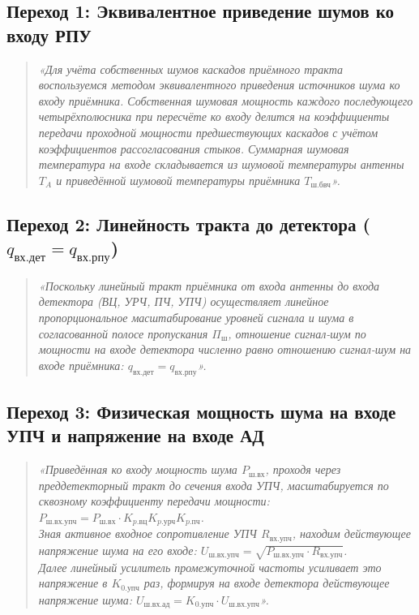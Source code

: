 \documentclass[12pt,a4paper]{article}
\begin{document}
\subsection{Переход 1: Эквивалентное приведение шумов ко входу РПУ}
\begin{quote}
\textit{«Для учёта собственных шумов каскадов приёмного тракта воспользуемся методом эквивалентного приведения источников шума ко входу приёмника. Собственная шумовая мощность каждого последующего четырёхполюсника при пересчёте ко входу делится на коэффициенты передачи проходной мощности предшествующих каскадов с учётом коэффициентов рассогласования стыков. Суммарная шумовая температура на входе складывается из шумовой температуры антенны $T_A$ и приведённой шумовой температуры приёмника $T_{\text{ш.бвч}}$».}
\end{quote}

\subsection{Переход 2: Линейность тракта до детектора ($q_{\text{вх.дет}} = q_{\text{вх.рпу}}$)}
\begin{quote}
\textit{«Поскольку линейный тракт приёмника от входа антенны до входа детектора (ВЦ, УРЧ, ПЧ, УПЧ) осуществляет линейное пропорциональное масштабирование уровней сигнала и шума в согласованной полосе пропускания $\Pi_{\text{ш}}$, отношение сигнал-шум по мощности на входе детектора численно равно отношению сигнал-шум на входе приёмника: $q_{\text{вх.дет}} = q_{\text{вх.рпу}}$».}
\end{quote}

\subsection{Переход 3: Физическая мощность шума на входе УПЧ и напряжение на входе АД}
\begin{quote}
\textit{«Приведённая ко входу мощность шума $P_{\text{ш.вх}}$, проходя через преддетекторный тракт до сечения входа УПЧ, масштабируется по сквозному коэффициенту передачи мощности: $P_{\text{ш.вх.упч}} = P_{\text{ш.вх}} \cdot K_{p.\text{вц}} K_{p.\text{урч}} K_{p.\text{пч}}$.\\
Зная активное входное сопротивление УПЧ $R_{\text{вх.упч}}$, находим действующее напряжение шума на его входе: $U_{\text{ш.вх.упч}} = \sqrt{P_{\text{ш.вх.упч}} \cdot R_{\text{вх.упч}}}$.\\
Далее линейный усилитель промежуточной частоты усиливает это напряжение в $K_{0.\text{упч}}$ раз, формируя на входе детектора действующее напряжение шума: $U_{\text{ш.вх.ад}} = K_{0.\text{упч}} \cdot U_{\text{ш.вх.упч}}$».}
\end{quote}
\end{document}

